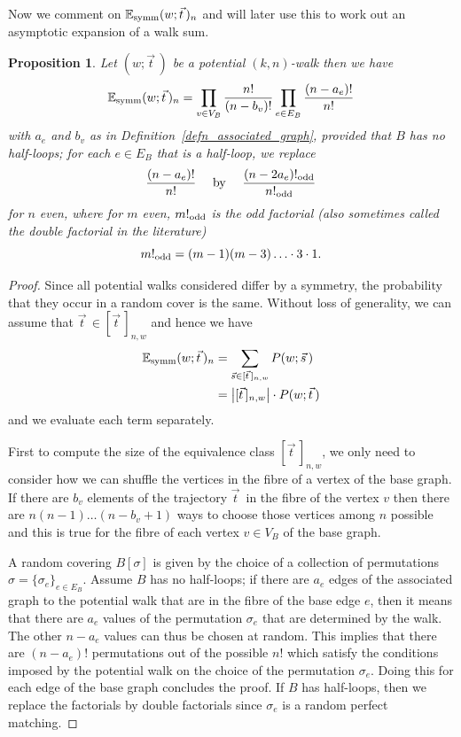 \documentclass{memo-l}
\newcommand{\oddf}{!_{\rm odd}}
\theoremstyle{plain}
\theoremstyle{definition}
\numberwithin{section}{chapter}
\numberwithin{equation}{chapter}
\newcommand{\potwalk}{(w;\vec t\,)}
\theoremstyle{plain}
\newtheorem{prop}[theorem]{Proposition}
\theoremstyle{definition}
\newcommand\EE{\mathbb{E}}
\begin{document}
Now we comment on \(\EE_{\rm{symm}}\potwalk_n\) and will later use this to
work out an asymptotic expansion of a walk sum.

\begin{prop}\label{prop:EsymmProd} Let \( \potwalk \) be a potential
\((k,n)\)-walk then we have \begin{equation}\label{eq:walk_probability}
\EE_{\rm{symm}}\potwalk_n = \prod_{v \in V_B} \frac{n!}{(n-b_v)!} \prod_{e
\in E_B} \frac{(n-a_e)!}{n!} \end{equation} with \( a_e \) and \( b_v \) as
in Definition~\ref{defn_associated_graph}, provided that \( B \) has no
half-loops; for each \( e \in E_B \) that is a half-loop, we replace \[
\frac{(n-a_e)!}{n!} \quad \text{ by } \quad \frac{(n-2a_e)\oddf}{n\oddf} \]
for $n$ even, where for $m$ even, $m\oddf$ is the {\em odd factorial}
(also sometimes called the {\em double factorial} in the literature)
$$
m\oddf = (m-1)(m-3)\ldots \cdot 3\cdot 1.
$$
\end{prop} 
\begin{proof} Since all potential walks considered differ by a
symmetry, the probability that they occur in a random cover is the same.
Without loss of generality, we can assume that \( \vec t\, \in [\vec
t\,]_{n,w} \) and hence we have \begin{align*} \EE_{\rm{symm}}\potwalk_n &=
\sum_{\vec s \in [\vec t \, ]_{n,w}} P(w;\vec s\,) \\ &= \left| [\vec
t\,]_{n,w} \right| \cdot P\potwalk \end{align*} and we evaluate each term
separately.

First to compute the size of the equivalence class \( [\vec t\,]_{n,w} \),
we only need to consider how we can shuffle the vertices in the fibre of a
vertex of the base graph. If there are \( b_v \) elements of the trajectory
\( \vec t\, \) in the fibre of the vertex \( v \) then there are \(
n(n-1)\ldots (n-b_v+1) \) ways to choose those vertices among \( n \)
possible and this is true for the fibre of each vertex \( v \in V_B \) of
the base graph.

A random covering \( B[\sigma] \) is given by the choice of a collection of
permutations \( \sigma = \{ \sigma_e \}_{e \in E_B}\). Assume \( B \) has
no half-loops; if there are \( a_e \) edges of the associated graph to the
potential walk that are in the fibre of the base edge \(e\), then it means
that there are \( a_e \) values of the permutation \( \sigma_e \) that are
determined by the walk. The other \( n-a_e \) values can thus be chosen at
random. This implies that there are \( (n-a_e)! \) permutations out of the
possible \( n! \) which satisfy the conditions imposed by the potential
walk on the choice of the permutation \( \sigma_e \). Doing this for each
edge of the base graph concludes the proof. If \( B \) has half-loops, then
we replace the factorials by double factorials
since \( \sigma_e \) is a random perfect matching.
\end{proof}
%
%
%
%
\end{document}
